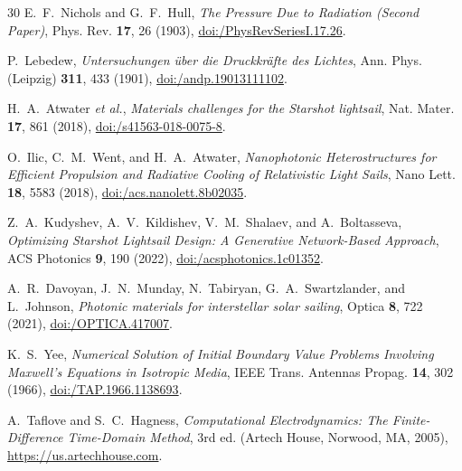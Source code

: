 \documentclass[aps,prd,reprint,superscriptaddress,nofootinbib,floatfix]{revtex4-2}
\begin{document}
\begin{thebibliography}{30}
 E.~F.~Nichols and G.~F.~Hull, \textit{The Pressure Due to Radiation (Second Paper)}, Phys. Rev. \textbf{17}, 26 (1903), \href{https://doi.org/10.1103/PhysRevSeriesI.17.26}{doi:/\allowbreak PhysRevSeriesI.17.26}.

 P.~Lebedew, \textit{Untersuchungen {\"u}ber die Druckkr{\"a}fte des Lichtes}, Ann. Phys. (Leipzig) \textbf{311}, 433 (1901), \href{https://doi.org/10.1002/andp.19013111102}{doi:/\allowbreak andp.19013111102}.

 H.~A.~Atwater \textit{et al.}, \textit{Materials challenges for the Starshot lightsail}, Nat. Mater. \textbf{17}, 861 (2018), \href{https://doi.org/10.1038/s41563-018-0075-8}{doi:/\allowbreak s41563-018-0075-8}.

 O.~Ilic, C.~M.~Went, and H.~A.~Atwater, \textit{Nanophotonic Heterostructures for Efficient Propulsion and Radiative Cooling of Relativistic Light Sails}, Nano Lett. \textbf{18}, 5583 (2018), \href{https://doi.org/10.1021/acs.nanolett.8b02035}{doi:/\allowbreak acs.nanolett.8b02035}.

 Z.~A.~Kudyshev, A.~V.~Kildishev, V.~M.~Shalaev, and A.~Boltasseva, \textit{Optimizing Starshot Lightsail Design: A Generative Network-Based Approach}, ACS Photonics \textbf{9}, 190 (2022), \href{https://doi.org/10.1021/acsphotonics.1c01352}{doi:/\allowbreak acsphotonics.1c01352}.

 A.~R.~Davoyan, J.~N.~Munday, N.~Tabiryan, G.~A.~Swartzlander, and L.~Johnson, \textit{Photonic materials for interstellar solar sailing}, Optica \textbf{8}, 722 (2021), \href{https://doi.org/10.1364/OPTICA.417007}{doi:/\allowbreak OPTICA.417007}.

 K.~S.~Yee, \textit{Numerical Solution of Initial Boundary Value Problems Involving Maxwell's Equations in Isotropic Media}, IEEE Trans. Antennas Propag. \textbf{14}, 302 (1966), \href{https://doi.org/10.1109/TAP.1966.1138693}{doi:/\allowbreak TAP.1966.1138693}.

 A.~Taflove and S.~C.~Hagness, \textit{Computational Electrodynamics: The Finite-Difference Time-Domain Method}, 3rd ed. (Artech House, Norwood, MA, 2005), \href{https://us.artechhouse.com/Computational-Electrodynamics-The-Finite-Difference-Time-Domain-Method-Third-Edition-P2342.aspx}{https://\allowbreak us.artechhouse.com}.


\end{thebibliography}
\end{document}
